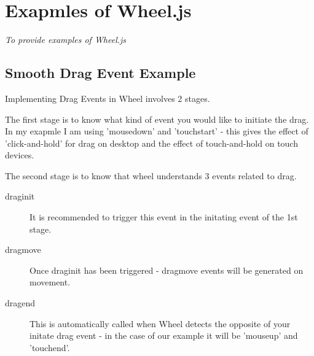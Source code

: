 
\chapter{Exapmles of Wheel.js}
\begin{center}
{\small\em To provide examples of Wheel.js}
\end{center}

\section{Smooth Drag Event Example} %
\label{sec:Smooth Drag Event Example}

 Implementing Drag Events in Wheel involves 2 stages.

 The first stage is to know what kind of event you would like to initiate the drag.
 In my exapmle I am using 'mousedown' and 'touchstart' - this gives the effect of 'click-and-hold'
 for drag on desktop and the effect of touch-and-hold on touch devices.

 The second stage is to know that wheel understands 3 events related to drag.
 \begin{description}
   \item[draginit] It is recommended to trigger this event in the initating 
                   event of the 1st stage.
   \item[dragmove] Once draginit has been triggered - dragmove events 
                   will be generated on movement.
   \item[dragend]  This is automatically called when Wheel detects the 
                   opposite of your initate drag event - in the case of our example
                   it will be 'mouseup' and 'touchend'.
 \end{description}


 

